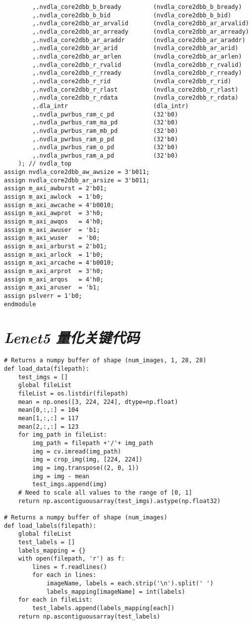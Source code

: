 \begin{lstlisting}
        ,.nvdla_core2dbb_b_bready         (nvdla_core2dbb_b_bready)
        ,.nvdla_core2dbb_b_bid            (nvdla_core2dbb_b_bid)
        ,.nvdla_core2dbb_ar_arvalid       (nvdla_core2dbb_ar_arvalid)
        ,.nvdla_core2dbb_ar_arready       (nvdla_core2dbb_ar_arready)
        ,.nvdla_core2dbb_ar_araddr        (nvdla_core2dbb_ar_araddr)
        ,.nvdla_core2dbb_ar_arid          (nvdla_core2dbb_ar_arid)
        ,.nvdla_core2dbb_ar_arlen         (nvdla_core2dbb_ar_arlen)
        ,.nvdla_core2dbb_r_rvalid         (nvdla_core2dbb_r_rvalid)
        ,.nvdla_core2dbb_r_rready         (nvdla_core2dbb_r_rready)
        ,.nvdla_core2dbb_r_rid            (nvdla_core2dbb_r_rid)
        ,.nvdla_core2dbb_r_rlast          (nvdla_core2dbb_r_rlast)
        ,.nvdla_core2dbb_r_rdata          (nvdla_core2dbb_r_rdata)
        ,.dla_intr                        (dla_intr)
        ,.nvdla_pwrbus_ram_c_pd           (32'b0)
        ,.nvdla_pwrbus_ram_ma_pd          (32'b0)
        ,.nvdla_pwrbus_ram_mb_pd          (32'b0)
        ,.nvdla_pwrbus_ram_p_pd           (32'b0)
        ,.nvdla_pwrbus_ram_o_pd           (32'b0)
        ,.nvdla_pwrbus_ram_a_pd           (32'b0)
    ); // nvdla_top
assign nvdla_core2dbb_aw_awsize = 3'b011;
assign nvdla_core2dbb_ar_arsize = 3'b011;
assign m_axi_awburst = 2'b01;
assign m_axi_awlock  = 1'b0;
assign m_axi_awcache = 4'b0010;
assign m_axi_awprot  = 3'h0;
assign m_axi_awqos   = 4'h0;
assign m_axi_awuser  = 'b1;
assign m_axi_wuser   = 'b0;
assign m_axi_arburst = 2'b01;
assign m_axi_arlock  = 1'b0;
assign m_axi_arcache = 4'b0010;
assign m_axi_arprot  = 3'h0;
assign m_axi_arqos   = 4'h0;
assign m_axi_aruser  = 'b1;
assign pslverr = 1'b0;
endmodule
\end{lstlisting}

\section{\emph{Lenet5 量化关键代码}}

\lstset{language=Python}
\begin{lstlisting}
# Returns a numpy buffer of shape (num_images, 1, 28, 28)
def load_data(filepath):
    test_imgs = []
    global fileList
    fileList = os.listdir(filepath)
    mean = np.ones([3, 224, 224], dtype=np.float)
    mean[0,:,:] = 104
    mean[1,:,:] = 117
    mean[2,:,:] = 123
    for img_path in fileList:
        img_path = filepath +'/'+ img_path
        img = cv.imread(img_path)
        img = crop_img(img, [224, 224])
        img = img.transpose((2, 0, 1))
        img = img - mean
        test_imgs.append(img)
    # Need to scale all values to the range of [0, 1]
    return np.ascontiguousarray(test_imgs).astype(np.float32)

# Returns a numpy buffer of shape (num_images)
def load_labels(filepath):
    global fileList
    test_labels = []
    labels_mapping = {}
    with open(filepath, 'r') as f:
        lines = f.readlines()
        for each in lines:
            imageName, labels = each.strip('\n').split(' ')
            labels_mapping[imageName] = int(labels)
    for each in fileList:
        test_labels.append(labels_mapping[each])
    return np.ascontiguousarray(test_labels)
\end{lstlisting}


